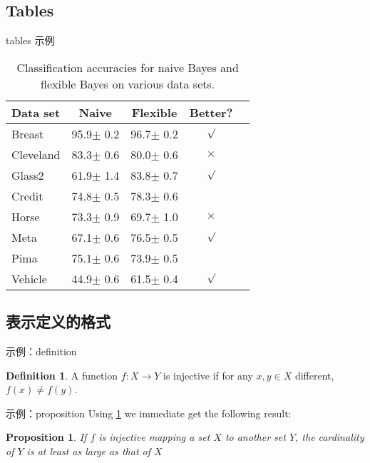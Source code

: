 \documentclass{article}
\theoremstyle{plain}
\newtheorem{proposition}[theorem]{Proposition}
\theoremstyle{definition}
\newtheorem{definition}[theorem]{Definition}
\theoremstyle{remark}
\begin{document}
\subsection{Tables}
tables 示例
\begin{table}[t]
\caption{Classification accuracies for naive Bayes and flexible
Bayes on various data sets.}
\label{sample-table}
\vskip 0.15in
\begin{center}
\begin{small}
\begin{sc}
\begin{tabular}{lcccr}
\toprule
Data set & Naive & Flexible & Better? \\
\midrule
Breast    & 95.9$\pm$ 0.2& 96.7$\pm$ 0.2& $\surd$ \\
Cleveland & 83.3$\pm$ 0.6& 80.0$\pm$ 0.6& $\times$\\
Glass2    & 61.9$\pm$ 1.4& 83.8$\pm$ 0.7& $\surd$ \\
Credit    & 74.8$\pm$ 0.5& 78.3$\pm$ 0.6&         \\
Horse     & 73.3$\pm$ 0.9& 69.7$\pm$ 1.0& $\times$\\
Meta      & 67.1$\pm$ 0.6& 76.5$\pm$ 0.5& $\surd$ \\
Pima      & 75.1$\pm$ 0.6& 73.9$\pm$ 0.5&         \\
Vehicle   & 44.9$\pm$ 0.6& 61.5$\pm$ 0.4& $\surd$ \\
\bottomrule
\end{tabular}
\end{sc}
\end{small}
\end{center}
\vskip -0.1in
\end{table}


\subsection{表示定义的格式}

示例：definition
\begin{definition}
\label{def:inj}
A function $f:X \to Y$ is injective if for any $x,y\in X$ different, $f(x)\ne f(y)$.
\end{definition}

示例：proposition
Using \cref{def:inj} we immediate get the following result:
\begin{proposition}
If $f$ is injective mapping a set $X$ to another set $Y$, 
the cardinality of $Y$ is at least as large as that of $X$
\end{proposition}
\end{document}
